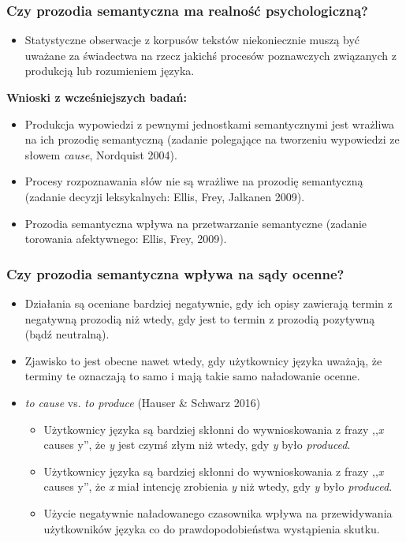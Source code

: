 \documentclass[11pt]{beamer}
\begin{document}
\begin{frame}[t]
  \frametitle{Czy prozodia semantyczna ma realność psychologiczną?}
  \begin{itemize}
  \item Statystyczne obserwacje z korpusów tekstów niekoniecznie muszą być uważane za świadectwa na rzecz jakichś procesów poznawczych związanych z produkcją lub rozumieniem języka.
  \end{itemize}

  \vspace{1em}

  \textbf{Wnioski z wcześniejszych badań:}
  \begin{itemize}
  \item Produkcja wypowiedzi z pewnymi jednostkami semantycznymi jest wrażliwa na ich prozodię semantyczną (zadanie polegające na tworzeniu wypowiedzi ze słowem \textit{cause}, Nordquist 2004).
  \item Procesy rozpoznawania słów nie są wrażliwe na prozodię semantyczną (zadanie decyzji leksykalnych: Ellis, Frey, Jalkanen 2009).
  \item Prozodia semantyczna wpływa na przetwarzanie semantyczne (zadanie torowania afektywnego: Ellis, Frey, 2009).
  \end{itemize}
\end{frame}

\begin{frame}
  \frametitle{Czy prozodia semantyczna wpływa na sądy ocenne?}
  \begin{itemize}
  \item Działania są oceniane bardziej negatywnie, gdy ich opisy zawierają termin z negatywną prozodią niż wtedy, gdy jest to termin z prozodią pozytywną (bądź neutralną).
  \item Zjawisko to jest obecne nawet wtedy, gdy użytkownicy języka uważają, że terminy te oznaczają to samo i mają takie samo naładowanie ocenne.
  \item \textit{to cause} vs. \textit{to produce} (Hauser \& Schwarz 2016)
    \begin{itemize}
    \item Użytkownicy języka są bardziej skłonni do wywnioskowania z frazy ,,\textit{x} causes \textit{}y'', że \textit{y} jest czymś złym niż wtedy, gdy \textit{y} było \textit{produced}.
    \item Użytkownicy języka są bardziej skłonni do wywnioskowania z frazy ,,\textit{x} causes \textit{}y'', że \textit{x} miał intencję zrobienia \textit{y} niż wtedy, gdy \textit{y} było \textit{produced}.
    \item Użycie negatywnie naładowanego czasownika wpływa na przewidywania użytkowników języka co do prawdopodobieństwa wystąpienia skutku.
    \end{itemize}
  \end{itemize}
\end{frame}
\end{document}
